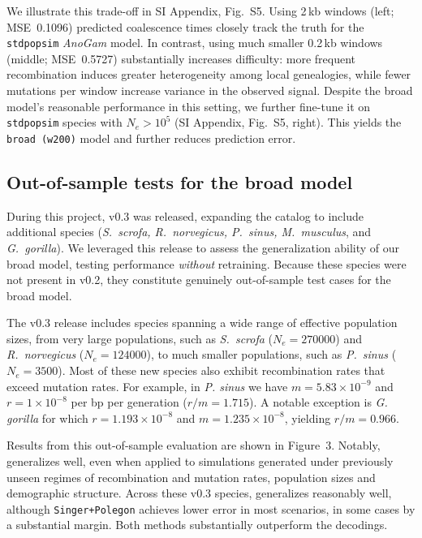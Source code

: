 \documentclass[9pt,twocolumn,twoside]{pnas-new}
\begin{document}
We illustrate this trade-off in SI Appendix, Fig.~S5. 
Using 2\,kb windows (left; MSE~0.1096) predicted coalescence times closely track the truth for the \texttt{stdpopsim} \textit{AnoGam} model.
In contrast, using much smaller 0.2\,kb windows (middle; MSE~0.5727) substantially increases difficulty:
more frequent recombination induces greater heterogeneity among local genealogies,
while fewer mutations per window increase variance in the observed signal. 
Despite the broad model's reasonable performance in this setting, 
we further fine-tune it on \texttt{stdpopsim} species with $N_e > 10^5$ (SI Appendix, Fig.~S5, right).
This yields the \texttt{broad~(w200)} model and further reduces prediction error.




\subsection*{Out-of-sample tests for the broad model}
During this project, \stdpopsim v0.3 was released, expanding the catalog to include additional species 
(\textit{S.~scrofa, R.~norvegicus, P.~sinus, M.~musculus}, and \textit{G.~gorilla}). 
We leveraged this release to assess the generalization ability of our broad model, testing performance \emph{without} retraining. 
Because these species were not present in \stdpopsim v0.2, they constitute genuinely out-of-sample test cases for the broad model.

The v0.3 release includes species spanning a wide range of effective population sizes, from very large populations, 
such as \emph{S.~scrofa} ($N_e = 270000$) and \emph{R.~norvegicus} ($N_e = 124000$), 
to much smaller populations, such as \emph{P.~sinus} ($N_e = 3500$). 
Most of these new species also exhibit recombination rates that exceed mutation rates.
For example, in  \emph{P. sinus} we have $m=5.83\times10^{-9}$ and $r=1\times10^{-8}$ per bp per generation ($r/m=1.715$).
A notable exception is \emph{G. gorilla} for which $r=1.193\times10^{-8}$ and $m=1.235\times10^{-8}$, yielding $r/m=0.966$.



Results from this out-of-sample evaluation are shown in Figure~3. 
Notably, \cxtkit generalizes well, even when applied to simulations generated under previously unseen regimes 
of recombination and mutation rates, population sizes and demographic structure.
Across these v0.3 species, \cxtkit generalizes reasonably well, although \texttt{Singer+Polegon} achieves lower error in most scenarios, in some cases by a substantial margin. Both methods substantially outperform the \smcpp decodings.
\end{document}
